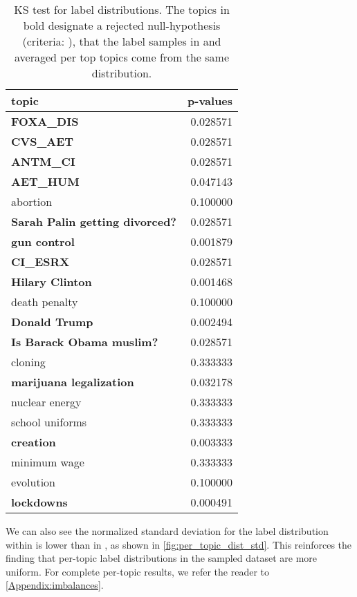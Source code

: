 \documentclass[11pt]{article}
\begin{document}
\begin{table}[t]
\centering
\fontsize{8}{9}\selectfont
\begin{tabular}{@{}lr@{}}
\toprule
topic                                  & p-values \\ \midrule
\textbf{FOXA\_DIS}                     & 0.028571 \\
\textbf{CVS\_AET}                      & 0.028571 \\
\textbf{ANTM\_CI}                      & 0.028571 \\
\textbf{AET\_HUM}                      & 0.047143 \\
abortion                               & 0.100000 \\
\textbf{Sarah Palin getting divorced?} & 0.028571 \\
\textbf{gun control}                   & 0.001879 \\
\textbf{CI\_ESRX}                      & 0.028571 \\
\textbf{Hilary Clinton}                & 0.001468 \\
death penalty                          & 0.100000 \\
\textbf{Donald Trump}                  & 0.002494 \\
\textbf{Is Barack Obama muslim?}       & 0.028571 \\
cloning                                & 0.333333 \\
\textbf{marijuana legalization}        & 0.032178 \\
nuclear energy                         & 0.333333 \\
school uniforms                        & 0.333333 \\
\textbf{creation}                      & 0.003333 \\
minimum wage                           & 0.333333 \\
evolution                              & 0.100000 \\
\textbf{lockdowns}                     & 0.000491 \\ \bottomrule
\end{tabular}
\caption{KS test for label distributions. The topics in bold designate a rejected null-hypothesis (criteria: ), that the label samples in  and  averaged per top  topics come from the same distribution.}
\label{tab:per_topic_imbalance}
\end{table}

We can also see the normalized standard deviation for the label distribution within  is lower than in , as shown in \autoref{fig:per_topic_dist_std}. This reinforces the finding that per-topic label distributions in the sampled dataset are more uniform. For complete per-topic results, we refer the reader to  \autoref{Appendix:imbalances}.
\end{document}
